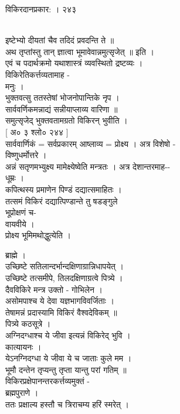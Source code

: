 \documentclass[11pt, openany]{book}
\begin{document}
{{ }{ विकिरदानप्रकार: । २४३}{\\
इष्टेभ्यो दीयतां चैव तदिदं प्रवदन्ति ते ॥\\
अथ तृप्तांस्तु तान् ज्ञात्वा भूमावेवान्नमुत्सृजेत् ॥ इति ।\\
एवं च पदार्थक्रमो यथाशास्त्रं व्यवस्थितो द्रष्टव्यः ।\\
विकिरेतिकर्त्तव्यतामाह -\\
मनुः ।\\
भुक्तवत्सु ततस्तेषां भोजनोपान्तिके नृप ।\\
सार्ववर्णिकमन्नाद्यं सन्नीयाप्लाव्य वारिणा ॥\\
समुत्सृजेद् भुक्तवतामग्रतो विकिरन् भुवीति ।\\
{[} अ० ३ श्लो० २४४ {]}\\
सार्ववार्णिकं = सर्वप्रकारम् \textbar{} आष्लाव्य = प्रोक्ष्य । अत्र
विशेषो -\\
विष्णुधर्मोत्तरे ।\\
अन्नं सतृणमभ्युक्ष्य मामेक्ष्येष्वेति मन्त्रतः । अत्र देशान्तरमाह-\/-\\
धूम्रः ।\\
कपित्थस्य प्रमाणेन पिण्डं दद्यात्समाहितः ।\\
तत्समं विकिरं दद्यात्पिण्डान्ते तु षडङ्गुले \textbar{}\\
भूप्रोक्षणं च-\\
वायवीये ।\\
प्रोक्ष्य भूमिमथोद्धुत्येति ।

{ब्राह्मे ।\\
उच्छिष्टे सतिलान्दर्भान्दक्षिणाग्रान्निधापयेत् ।\\
उच्छिष्टे तत्समीपे, तिलदक्षिणाग्रत्वे पित्र्ये ।\\
दैवविकिरे मन्त्र उक्तो - गोभिलेन ।\\
असोमपाश्च ये देवा यज्ञभागविवर्जिताः ।\\
तेषामन्नं प्रदास्यामि विकिरं वैश्वदेविकम् ॥\\
पित्र्ये कठसूत्रे ।\\
अग्निदग्धाश्च ये जीवा इत्यन्नं विकिरेद् भुवि ।\\
कात्यायनः ।\\
येऽनग्निदग्धा ये जीवा ये च जाताः कुले मम ।\\
भूमौ दन्तेन तृप्यन्तु तृप्ता यान्तु परां गतिम् ॥\\
विकिरप्रक्षेपानन्तरकर्त्तव्यमुक्तं -\\
ब्रह्मपुराणे ।\\
ततः प्रक्षाल्य हस्तौ च त्रिराचम्य हरिं स्मरेत् ।

}}}
\end{document}

